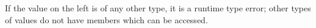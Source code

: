 \begin{prooftree}
\end{prooftree}

\begin{prooftree}
\end{prooftree}

\begin{prooftree}
\end{prooftree}

If the value on the left is of any other type, it is a runtime type error;
other types of values do not have members which can be accessed.
